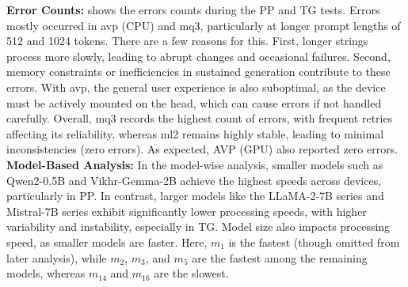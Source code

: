 {\noindent{}\textbf{Error Counts:}  shows the errors counts during the PP and TG tests. Errors mostly occurred in \gls{avp} (CPU) and \gls{mq3}, particularly at longer prompt lengths of 512 and 1024 tokens. There are a few reasons for this. First, longer strings process more slowly, leading to abrupt changes and occasional failures. Second, memory constraints or inefficiencies in sustained generation contribute to these errors. With \gls{avp}, the general user experience is also suboptimal, as the device must be actively mounted on the head, which can cause errors if not handled carefully. Overall, \gls{mq3} records the highest count of errors, with frequent retries affecting its reliability, whereas \gls{ml2} remains highly stable, leading to minimal inconsistencies (zero errors). As expected, AVP (GPU) also reported zero errors. \\
\textbf{Model-Based Analysis:} In the model-wise analysis, smaller models such as Qwen2-0.5B and Vikhr-Gemma-2B achieve the highest speeds across devices, particularly in PP. In contrast, larger models like the LLaMA-2-7B series and Mistral-7B series exhibit significantly lower processing speeds, with higher variability and instability, especially in TG. Model size also impacts processing speed, as smaller models are faster. Here, $m_1$ is the fastest (though omitted from later analysis), while $m_2$, $m_3$, and $m_5$ are the fastest among the remaining models, whereas $m_{14}$ and $m_{16}$ are the slowest.}

